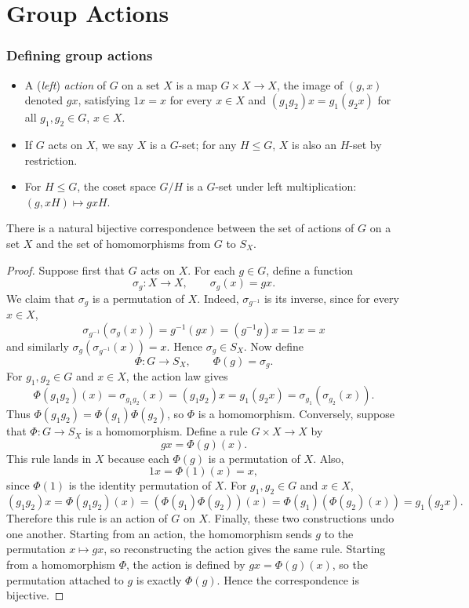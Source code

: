 \documentclass[../Odyssey_Project.tex]{subfiles}
\begin{document}
\setcounter{section}{2}
\section{Group Actions}

\subsubsection*{Defining group actions}
\begin{itemize}
    \item A (\emph{left}) \emph{action} of $G$ on a set $X$ is a map $G \times X \to X$, the image of $(g,x)$ denoted $gx$, satisfying $1x = x$ for every $x \in X$ and $(g_1 g_2) x = g_1 (g_2 x)$ for all $g_1, g_2 \in G$, $x \in X$.
    \item If $G$ acts on $X$, we say $X$ is a $G$-set; for any $H \leq G$, $X$ is also an $H$-set by restriction.
    \item For $H \leq G$, the coset space $G/H$ is a $G$-set under left multiplication: $(g, xH) \mapsto gxH$.
\end{itemize}

\begin{proposition}
\label{prop:3.1}
There is a natural bijective correspondence between the set of actions of $G$ on a set $X$ and the set of homomorphisms from $G$ to $S_X$.
\end{proposition}

\begin{proof}
    Suppose first that $G$ acts on $X$. For each $g \in G$, define a function
    \[
        \sigma_g \colon X \to X, \qquad \sigma_g(x) = gx.
    \]
    We claim that $\sigma_g$ is a permutation of $X$. Indeed, $\sigma_{g^{-1}}$ is its inverse, since for every $x \in X$,
    \[
        \sigma_{g^{-1}}(\sigma_g(x)) = g^{-1}(gx) = (g^{-1}g)x = 1x = x
    \]
    and similarly $\sigma_g(\sigma_{g^{-1}}(x)) = x$. Hence $\sigma_g \in S_X$. Now define
    \[
        \Phi \colon G \to S_X, \qquad \Phi(g) = \sigma_g.
    \]
    For $g_1,g_2 \in G$ and $x \in X$, the action law gives
    \[
        \Phi(g_1g_2)(x)
        = \sigma_{g_1g_2}(x)
        = (g_1g_2)x
        = g_1(g_2x)
        = \sigma_{g_1}(\sigma_{g_2}(x)).
    \]
    Thus $\Phi(g_1g_2) = \Phi(g_1)\Phi(g_2)$, so $\Phi$ is a homomorphism.
    Conversely, suppose that $\Phi \colon G \to S_X$ is a homomorphism. Define a rule $G \times X \to X$ by
    \[
        gx = \Phi(g)(x).
    \]
    This rule lands in $X$ because each $\Phi(g)$ is a permutation of $X$. Also,
    \[
        1x = \Phi(1)(x) = x,
    \]
    since $\Phi(1)$ is the identity permutation of $X$. For $g_1,g_2 \in G$ and $x \in X$,
    \[
        (g_1g_2)x
        = \Phi(g_1g_2)(x)
        = (\Phi(g_1)\Phi(g_2))(x)
        = \Phi(g_1)(\Phi(g_2)(x))
        = g_1(g_2x).
    \]
    Therefore this rule is an action of $G$ on $X$.
    Finally, these two constructions undo one another. Starting from an action, the homomorphism sends $g$ to the permutation $x \mapsto gx$, so reconstructing the action gives the same rule. Starting from a homomorphism $\Phi$, the action is defined by $gx = \Phi(g)(x)$, so the permutation attached to $g$ is exactly $\Phi(g)$. Hence the correspondence is bijective.
\end{proof}
\end{document}
